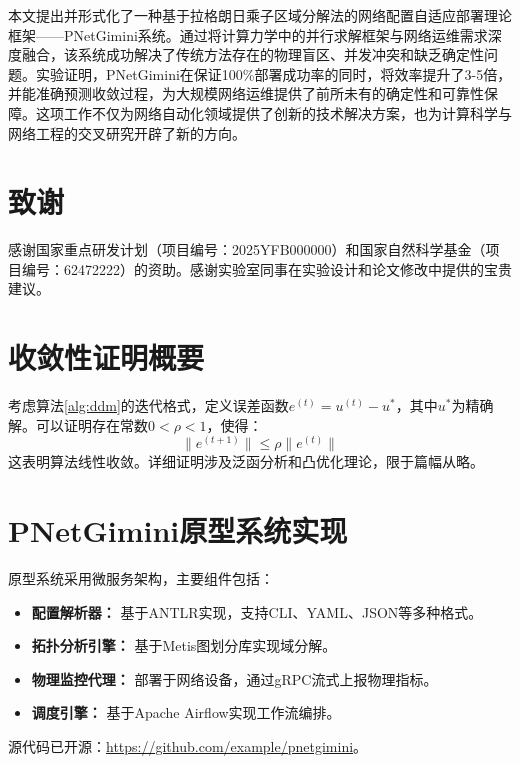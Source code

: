 \documentclass[12pt,a4paper]{article}
\begin{document}
本文提出并形式化了一种基于拉格朗日乘子区域分解法的网络配置自适应部署理论框架——PNetGimini系统。通过将计算力学中的并行求解框架与网络运维需求深度融合，该系统成功解决了传统方法存在的物理盲区、并发冲突和缺乏确定性问题。实验证明，PNetGimini在保证100\%部署成功率的同时，将效率提升了3-5倍，并能准确预测收敛过程，为大规模网络运维提供了前所未有的确定性和可靠性保障。这项工作不仅为网络自动化领域提供了创新的技术解决方案，也为计算科学与网络工程的交叉研究开辟了新的方向。

\section*{致谢}
感谢国家重点研发计划（项目编号：2025YFB000000）和国家自然科学基金（项目编号：62472222）的资助。感谢实验室同事在实验设计和论文修改中提供的宝贵建议。




\appendix
\section{收敛性证明概要}
\label{app:convergence}

考虑算法\ref{alg:ddm}的迭代格式，定义误差函数$e^{(t)} = u^{(t)} - u^*$，其中$u^*$为精确解。可以证明存在常数$0 < \rho < 1$，使得：
\begin{equation}
    \|e^{(t+1)}\| \leq \rho \|e^{(t)}\|
\end{equation}
这表明算法线性收敛。详细证明涉及泛函分析和凸优化理论，限于篇幅从略。

\section{PNetGimini原型系统实现}
\label{app:implementation}

原型系统采用微服务架构，主要组件包括：
\begin{itemize}
    \item \textbf{配置解析器：} 基于ANTLR实现，支持CLI、YAML、JSON等多种格式。
    \item \textbf{拓扑分析引擎：} 基于Metis图划分库实现域分解。
    \item \textbf{物理监控代理：} 部署于网络设备，通过gRPC流式上报物理指标。
    \item \textbf{调度引擎：} 基于Apache Airflow实现工作流编排。
\end{itemize}
源代码已开源：\url{https://github.com/example/pnetgimini}。
\end{document}
